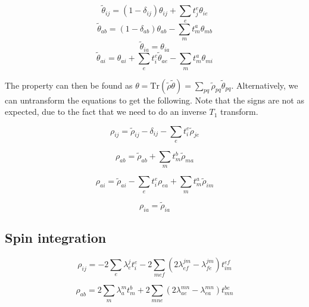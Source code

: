 \documentclass{article}
\begin{document}
\begin{equation}
  \tilde{\theta}_{ij} = \left(1 - \delta_{ij}\right)\theta_{ij} + \sum_et_j^e\theta_{ie}
\end{equation}
\begin{equation}
  \tilde{\theta}_{ab} = \left(1 - \delta_{ab}\right)\theta_{ab} - \sum_mt_m^a\theta_{mb}
\end{equation}
\begin{equation}
  \tilde{\theta}_{ia} = \theta_{ia}
\end{equation}
\begin{equation}
  \tilde{\theta}_{ai} = \theta_{ai} + \sum_et_i^e\tilde{\theta}_{ae} - \sum_mt_m^a\theta_{mi}
\end{equation}

The property can then be found as $\theta = \mathrm{Tr}\left(\tilde{\rho}\tilde{\theta}\right) = \sum_{pq}\tilde{\rho}_{pq}\tilde{\theta}_{pq}$. Alternatively, we can untransform the equations to get the following. Note that the signs are not as expected, due to the fact that we need to do an inverse $T_1$ transform.

\begin{equation}
  \rho_{ij} = \tilde{\rho}_{ij} - \delta_{ij} - \sum_et_i^e\tilde{\rho}_{je}
\end{equation}

\begin{equation}
  \rho_{ab} = \tilde{\rho}_{ab} + \sum_mt_m^b\tilde{\rho}_{ma}
\end{equation}

\begin{equation}
  \rho_{ai} = \tilde{\rho}_{ai} - \sum_et_i^e\rho_{ea} + \sum_mt_m^a\tilde{\rho}_{im}
\end{equation}

\begin{equation}
  \rho_{ia} = \tilde{\rho}_{ia}
\end{equation}

\subsection{Spin integration}

\begin{equation}
  \rho_{ij} = -2\sum_e\lambda_e^jt_i^e - 2\sum_{mef}\left(2\lambda_{ef}^{jm} - \lambda_{fe}^{jm}\right)t_{im}^{ef}
\end{equation}

\begin{equation}
  \rho_{ab} = 2\sum_m\lambda_a^mt_m^b + 2\sum_{mne}\left(2\lambda_{ae}^{mn} - \lambda_{ea}^{mn}\right)t_{mn}^{be}
\end{equation}
\end{document}
